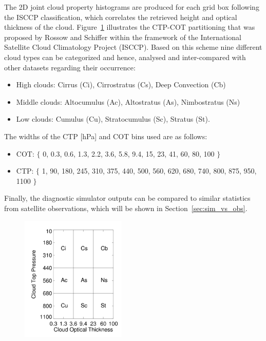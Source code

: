 \noindent
The 2D joint cloud property histograms are produced for each grid box following 
the ISCCP classification, which correlates the retrieved height and optical thickness of the cloud. 
Figure~\ref{fig:isccp} illustrates the CTP-COT partitioning that was proposed 
by Rossow and Schiffer \cite{Rossow1999} within the framework of the 
International Satellite Cloud Climatology Project (ISCCP).
Based on this scheme nine different cloud types can be categorized and hence,
analysed and inter-compared with other datasets regarding their occurrence:
\begin{itemize}\setlength\itemsep{0.2em}
 \item High clouds: Cirrus (Ci), Cirrostratus (Cs), Deep Convection (Cb)
 \item Middle clouds: Altocumulus (Ac), Altostratus (As), Nimbostratus (Ns)
 \item Low clouds: Cumulus (Cu), Stratocumulus (Sc), Stratus (St).
\end{itemize}
The widths of the CTP [hPa] and COT bins used are as follows:
\begin{itemize}\setlength\itemsep{0.2em}
 \item COT: $\{$ 0, 0.3, 0.6, 1.3, 2.2, 3.6, 5.8, 9.4, 15, 23, 41, 60, 80, 100 $\}$
 \item CTP: $\{$ 1, 90, 180, 245, 310, 375, 440, 500, 560, 620, 680, 740, 800, 875, 950, 1100 $\}$
\end{itemize}


Finally, the diagnostic simulator outputs can be compared to similar statistics from satellite 
observations, which will be shown in Section~\ref{sec:sim_vs_obs}.


\begin{figure}[!ht]
  \begin{minipage}{0.4\textwidth}
    \includegraphics[width=5cm,height=6cm]{./figures/isccp_uebersicht.png} 
  \end{minipage}
  \begin{minipage}{0.6\textwidth}
    \caption[ISCCP COT-CTP classification.]{\isccp}\label{fig:isccp}
  \end{minipage}
\end{figure}

